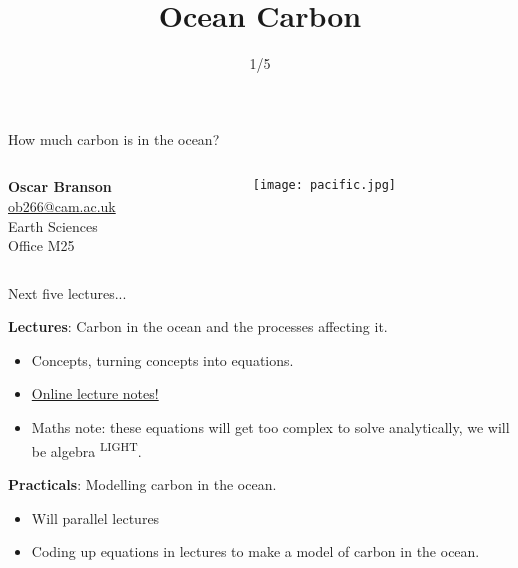 \documentclass[aspectratio=169]{beamer}
\title{Ocean Carbon}
\author{1/5}
\begin{document}
\begin{frame}{How much carbon is in the ocean?}
    \begin{columns}
        \begin{column}{0.3\linewidth}
            \textbf{Oscar Branson} \\ 
            \bigskip
            \href{mailto:ob266@cam.ac.uk}{ob266@cam.ac.uk} \\
            Earth Sciences \\
            Office M25
        \end{column}
        \begin{column}{0.7\linewidth}
            \texttt{[image: pacific.jpg]}
        \end{column}
    \end{columns}
\end{frame}

\begin{frame}{Next five lectures...}

\textbf{Lectures}: Carbon in the ocean and the processes affecting it.

\begin{itemize}
    \item Concepts, turning concepts into equations.
    \item \href{https://quantitative-environmental-science.github.io/Notes/06_oceancarbon/00_intro.html}{Online lecture notes!}
    \item Maths note: these equations will get too complex to solve analytically, we will be algebra \textsuperscript{LIGHT}.
\end{itemize}

\bigskip

\textbf{Practicals}: Modelling carbon in the ocean.

\begin{itemize}
    \item Will parallel lectures
    \item Coding up equations in lectures to make a model of carbon in the ocean.
\end{itemize}

\end{frame}
\end{document}
